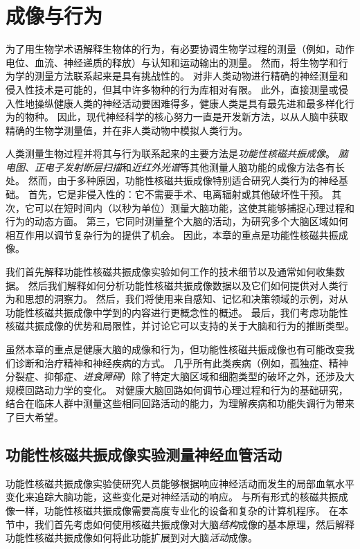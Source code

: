 \chapter{成像与行为} \label{chap:chap6}


为了用生物学术语解释生物体的行为，有必要协调生物学过程的测量（例如，动作电位、血流、神经递质的释放）与认知和运动输出的测量。
然而，将生物学和行为学的测量方法联系起来是具有挑战性的。
对非人类动物进行精确的神经测量和侵入性技术是可能的，但其中许多物种的行为库相对有限。
此外，直接测量或侵入性地操纵健康人类的神经活动要困难得多，健康人类是具有最先进和最多样化行为的物种。
因此，现代神经科学的核心努力一直是开发新方法，以从人脑中获取精确的生物学测量值，并在非人类动物中模拟人类行为。


人类测量生物过程并将其与行为联系起来的主要方法是\textit{功能性核磁共振成像}。
\textit{脑电图}、\textit{正电子发射断层扫描}和\textit{近红外光谱}等其他测量人脑功能的成像方法各有长处。
然而，由于多种原因，功能性核磁共振成像特别适合研究人类行为的神经基础。
首先，它是非侵入性的：它不需要手术、电离辐射或其他破坏性干预。
其次，它可以在短时间内（以秒为单位）测量大脑功能，这使其能够捕捉心理过程和行为的动态方面。
第三，它同时测量整个大脑的活动，为研究多个大脑区域如何相互作用以调节复杂行为的提供了机会。
因此，本章的重点是功能性核磁共振成像。


我们首先解释功能性核磁共振成像实验如何工作的技术细节以及通常如何收集数据。 
然后我们解释如何分析功能性核磁共振成像数据以及它们如何提供对人类行为和思想的洞察力。 
然后，我们将使用来自感知、记忆和决策领域的示例，对从功能性核磁共振成像中学到的内容进行更概念性的概述。
最后，我们考虑功能性核磁共振成像的优势和局限性，并讨论它可以支持的关于大脑和行为的推断类型。


虽然本章的重点是健康大脑的成像和行为，但功能性核磁共振成像也有可能改变我们诊断和治疗精神和神经疾病的方式。
几乎所有此类疾病（例如，孤独症、精神分裂症、抑郁症、\textit{进食障碍}）除了特定大脑区域和细胞类型的破坏之外，还涉及大规模回路动力学的变化。
对健康大脑回路如何调节心理过程和行为的基础研究，结合在临床人群中测量这些相同回路活动的能力，为理解疾病和功能失调行为带来了巨大希望。



\section{功能性核磁共振成像实验测量神经血管活动}

功能性核磁共振成像实验使研究人员能够根据响应神经活动而发生的局部血氧水平变化来追踪大脑功能，这些变化是对神经活动的响应。
与所有形式的核磁共振成像一样，功能性核磁共振成像需要高度专业化的设备和复杂的计算机程序。
在本节中，我们首先考虑如何使用核磁共振成像对大脑\textit{结构}成像的基本原理，然后解释功能性核磁共振成像如何将此功能扩展到对大脑\textit{活动}成像。


